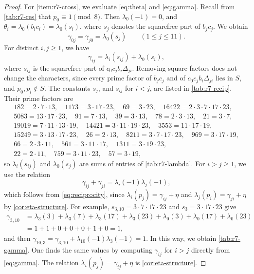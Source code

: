\documentclass[12pt,oneside,openany]{book}
\theoremstyle{definition}
\theoremstyle{plain}
\numberwithin{equation}{chapter}
\theoremstyle{plain}
\theoremstyle{definition}
\theoremstyle{remark}
\begin{document}
\begin{proof}
For \ref{item:r7-cross}, we evaluate \eqref{eq:theta} and \eqref{eq:gamma}.
Recall from \cref{tab:r7-res} that $p_0\equiv1\pmod8$. Then $\lambda_0(-1)=0$,
and $\theta_i=\lambda_0(b_ic_i)=\lambda_0(s_i)$, where $s_j$ denotes the
squarefree part of $b_jc_j$. We obtain
\[
 \gamma_{0j}=\gamma_{j0}=\lambda_0(s_j)\qquad(1\le j\le11).
\]
For distinct $i,j\ge1$, we have
\[
 \gamma_{ij}=\lambda_i(s_{ij})+\lambda_0(s_i),
\]
where $s_{ij}$ is the squarefree part of $c_0c_jb_i\Delta_{ji}$. Removing
square factors does not change the characters, since every prime factor of
$b_jc_j$ and of $c_0c_jb_i\Delta_{ji}$ lies in $S$, and $p_0,p_i\notin S$.
The constants $s_j$, and $s_{ij}$ for $i<j$, are listed in
\cref{tab:r7-recip}. Their prime factors are
\[
\begin{gathered}
 182=2\cdot7\cdot13,\quad 1173=3\cdot17\cdot23,\quad 69=3\cdot23,\quad
 16422=2\cdot3\cdot7\cdot17\cdot23,\\
 5083=13\cdot17\cdot23,\quad 91=7\cdot13,\quad 39=3\cdot13,\quad
 78=2\cdot3\cdot13,\quad 21=3\cdot7,\\
 19019=7\cdot11\cdot13\cdot19,\quad 14421=3\cdot11\cdot19\cdot23,\quad
 3553=11\cdot17\cdot19,\\
 15249=3\cdot13\cdot17\cdot23,\quad 26=2\cdot13,\quad
 8211=3\cdot7\cdot17\cdot23,\quad 969=3\cdot17\cdot19,\\
 66=2\cdot3\cdot11,\quad 561=3\cdot11\cdot17,\quad 1311=3\cdot19\cdot23,\\
 22=2\cdot11,\quad 759=3\cdot11\cdot23,\quad 57=3\cdot19,
\end{gathered}
\]
so $\lambda_i(s_{ij})$ and $\lambda_0(s_j)$ are sums of entries of
\cref{tab:r7-lambda}. For $i>j\ge1$, we use the relation
\[
 \gamma_{ij}+\gamma_{ji}=\lambda_i(-1)\lambda_j(-1),
\]
which follows from \eqref{eq:reciprocity}, since
$\lambda_i(p_j)=\gamma_{ij}+\eta$ and $\lambda_j(p_i)=\gamma_{ji}+\eta$ by
\cref{cor:eta-structure}. For example, $s_{3,10}=3\cdot7\cdot17\cdot23$ and
$s_3=3\cdot17\cdot23$ give
\[
\begin{aligned}
 \gamma_{3,10}&=\lambda_3(3)+\lambda_3(7)+\lambda_3(17)+\lambda_3(23)
 +\lambda_0(3)+\lambda_0(17)+\lambda_0(23)\\
 &=1+1+0+0+0+1+0=1,
\end{aligned}
\]
and then $\gamma_{10,3}=\gamma_{3,10}+\lambda_{10}(-1)\lambda_3(-1)=1$.
In this way, we obtain \cref{tab:r7-gamma}. One finds the same values by
computing $\gamma_{ij}$ for $i>j$ directly from \eqref{eq:gamma}. The relation
$\lambda_i(p_j)=\gamma_{ij}+\eta$ is \cref{cor:eta-structure}.
\end{proof}
\end{document}
